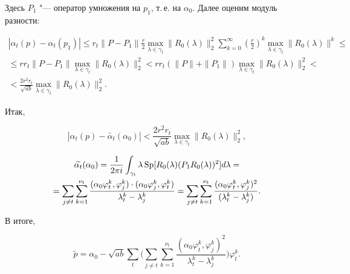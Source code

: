 Здесь $P_1$ "--- оператор умножения на $p_1 $,  т.\,е. на $\alpha_0 $.  Далее оценим модуль разности: 



\begin{multline*}

|\alpha_t(p)-\alpha_t(p_1)|\le r_t\|P-P_1\|

\frac{r}{2}\max_{\lambda\in\gamma_t}\|R_0(\lambda)\|_2^2\sum_{k=0}^\infty

\left(\frac{r}{2}\right)^k\max_{\lambda\in\gamma_t}\|R_0(\lambda)\|^k\le

\\

\le 

rr_t\|P-P_1\|\max_{\lambda\in\gamma_t}\|R_0(\lambda)\|_2^2<rr_t(\|P\|+\|P_1\|)\max_{\lambda\in\gamma_t}\|R_0(\lambda)\|_2^2<

\\

<

\frac{2r^2r_t}{\sqrt{ab}}\max_{\lambda\in\gamma_t}\|R_0(\lambda)\|_2^2. 

\end{multline*}



Итак, 

$$|\alpha_t(p)-\widetilde{\alpha_t}(\alpha_0)|<

\frac{2r^2r_t}{\sqrt{ab}}\max_{\lambda\in\gamma_t}\|R_0(\lambda)\|_2^2 ,$$

\begin{multline*}

 \widetilde{\alpha_t}(\alpha_0)=\frac1{2\pi

i}\int_{\gamma_t}\lambda\mathop{\rm

Sp}[R_0(\lambda)(P_1R_0(\lambda))^2]d\lambda=

\\

=\sum_{j\neq

t}\sum_{k=1}^{\nu_t}\frac{(\alpha_0\varphi_t^k, \varphi_j^k)\cdot(\alpha_0\varphi_j^k, \varphi_t^k)}{\lambda_t^k-\lambda_j^k}=\sum_{j\neq

t}\sum_{k=1}^{\nu_t}

\frac{(\alpha_0\varphi_t^k, \varphi_j^k)^2}{(\lambda_t^k-\lambda_j^k)} .

\end{multline*}



В итоге, 

\begin{equation}\label{ee}

\widetilde{p}=\alpha_0-\sqrt{ab}\sum_t \biggl(\sum_{j\neq

t}\sum_{k=1}^{\nu_t}

\frac{(\alpha_0\varphi_t^k, \varphi_j^k)^2}{\lambda_t^k-\lambda_j^k}\biggr)\varphi_t^k.

\end{equation}



